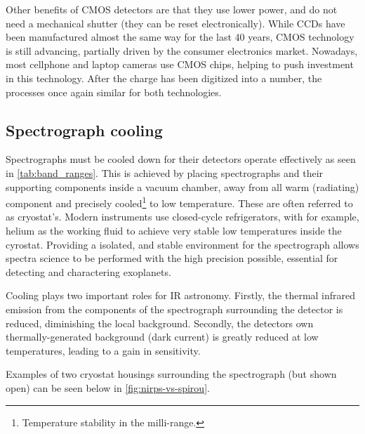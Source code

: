 Other benefits of {CMOS} detectors are that they use lower power, and do not need a mechanical shutter (they can be reset electronically).
While {CCDs} have been manufactured almost the same way for the last 40 years, {CMOS} technology is still advancing, partially driven by the consumer electronics market.
Nowadays, most cellphone and laptop cameras use {CMOS} chips, helping to push investment in this technology.
After the charge has been digitized into a number, the processes once again similar for both technologies.

\subsection{Spectrograph cooling}
\label{subsec:cold_spectrogrpah}
Spectrographs must be cooled down for their detectors operate effectively as seen in \cref{tab:band_ranges}.
This is achieved by placing spectrographs and their supporting components inside a vacuum chamber, away from all warm (radiating) component and precisely cooled\footnote{Temperature stability in the milli-\K range.} to low temperature.
These are often referred to as cryostat's.
Modern instruments use closed-cycle refrigerators, with for example, helium as the working fluid to achieve very stable low temperatures inside the cyrostat.
Providing a isolated, and stable environment for the spectrograph allows spectra science to be performed with the high precision possible, essential for detecting and charactering  exoplanets.

Cooling plays two important roles for {IR} astronomy.
Firstly, the thermal infrared emission from the components of the spectrograph surrounding the detector is reduced, diminishing the local background.
Secondly, the detectors own thermally-generated background (dark current) is greatly reduced at low temperatures, leading to a gain in sensitivity.

Examples of two cryostat housings surrounding the spectrograph (but shown open) can be seen below in \cref{fig:nirps-vs-spirou}.


